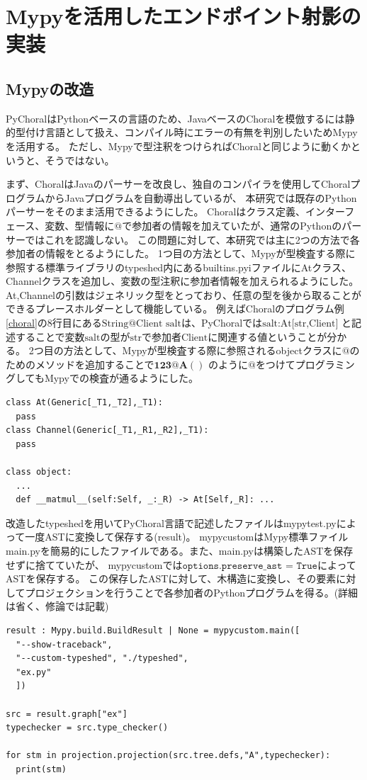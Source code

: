 \documentclass{thesis}
\begin{document}
\section{Mypyを活用したエンドポイント射影の実装}
\subsection{Mypyの改造}
PyChoralはPythonベースの言語のため、JavaベースのChoralを模倣するには静的型付け言語として扱え、コンパイル時にエラーの有無を判別したいためMypyを活用する。
ただし、Mypyで型注釈をつけらればChoralと同じように動くかというと、そうではない。

まず、ChoralはJavaのパーサーを改良し、独自のコンパイラを使用してChoralプログラムからJavaプログラムを自動導出しているが、
本研究では既存のPythonパーサーをそのまま活用できるようにした。
Choralはクラス定義、インターフェース、変数、型情報に$@$で参加者の情報を加えていたが、通常のPythonのパーサーではこれを認識しない。
この問題に対して、本研究では主に2つの方法で各参加者の情報をとるようにした。
1つ目の方法として、Mypyが型検査する際に参照する標準ライブラリのtypeshed内にあるbuiltins.pyiファイルにAtクラス、
Channelクラスを追加し、変数の型注釈に参加者情報を加えられるようにした。
At,Channelの引数はジェネリック型をとっており、任意の型を後から取ることができるプレースホルダーとして機能している。
例えばChoralのプログラム例\ref{choral}の8行目にある$\text{String@Client salt}$は、PyChoralでは$\text{salt:At[str,Client]}$
と記述することで変数$\text{salt}$の型が$\text{str}$で参加者$\text{Client}$に関連する値ということが分かる。
2つ目の方法として、Mypyが型検査する際に参照されるobjectクラスに$@$のためのメソッドを追加することで$\mathbf{123@A()}$
のように$@$をつけてプログラミングしてもMypyでの検査が通るようにした。
\begin{lstlisting}[caption=builtins.pyi]
class At(Generic[_T1,_T2],_T1):
  pass
class Channel(Generic[_T1,_R1,_R2],_T1):
  pass

class object:
  ... 
  def __matmul__(self:Self, _:_R) -> At[Self,_R]: ...
\end{lstlisting}
改造したtypeshedを用いてPyChoral言語で記述したファイルはmypytest.pyによって一度ASTに変換して保存する(result)。
mypycustomはMypy標準ファイルmain.pyを簡易的にしたファイルである。また、main.pyは構築したASTを保存せずに捨てていたが、
mypycustomでは$\texttt{options.preserve\_ast = True}$によってASTを保存する。
この保存したASTに対して、木構造に変換し、その要素に対してプロジェクションを行うことで各参加者のPythonプログラムを得る。(詳細は省く、修論では記載)
\begin{lstlisting}[caption=mypytest.py,label=mypytest]
result : Mypy.build.BuildResult | None = mypycustom.main([
  "--show-traceback", 
  "--custom-typeshed", "./typeshed",
  "ex.py"
  ])

src = result.graph["ex"] 
typechecker = src.type_checker()

for stm in projection.projection(src.tree.defs,"A",typechecker):
  print(stm)
\end{lstlisting}
\end{document}
